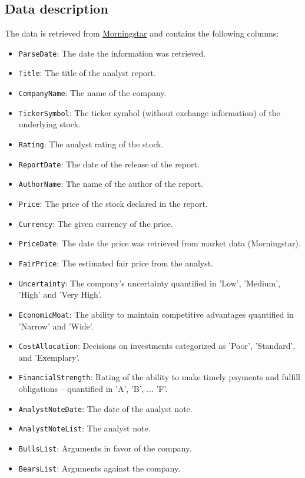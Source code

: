 \documentclass[conference]{IEEEtran}
\begin{document}
\subsection{Data description}%
The data is retrieved from \href{https://www.morningstar.co.uk/uk/}{Morningstar} and contains the following columns:
\begin{itemize}    
    \item \texttt{ParseDate}: The date the information was retrieved.
  \item \texttt{Title}: The title of the analyst report.
  \item \texttt{CompanyName}: The name of the company. 
  \item \texttt{TickerSymbol}: The ticker symbol (without exchange information) of the underlying stock.
  \item \texttt{Rating}: The analyst rating of the stock.
  \item \texttt{ReportDate}: The date of the release of the report. 
  \item \texttt{AuthorName}: The name of the author of the report. 
  \item \texttt{Price}: The price of the stock declared in the report.
  \item \texttt{Currency}: The given currency of the price. 
  \item \texttt{PriceDate}: The date the price was retrieved from market data (Morningstar).
  \item \texttt{FairPrice}: The estimated fair price from the analyst.
  \item \texttt{Uncertainty}: The company's uncertainty quantified in 'Low', 'Medium', 'High' and 'Very High'.
  \item \texttt{EconomicMoat}: The ability to maintain competitive advantages quantified in 'Narrow' and 'Wide'.
  \item \texttt{CostAllocation}:  Decisions on investments categorized as 'Poor', 'Standard', and 'Exemplary'.
  \item \texttt{FinancialStrength}: Rating of the ability to make timely payments and fulfill obligations -- quantified in 'A', 'B', ... 'F'.
  \item \texttt{AnalystNoteDate}: The date of the analyst note.
  \item \texttt{AnalystNoteList}: The analyst note.
  \item \texttt{BullsList}: Arguments in favor of the company.
  \item \texttt{BearsList}: Arguments against the company.

\end{itemize}
\end{document}
